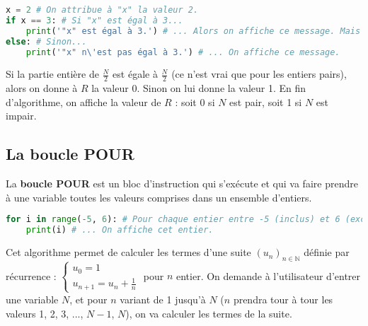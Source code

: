 	\begin{formula}[En python]
		\entretitreetliste
\begin{lstlisting}[language=python]
x = 2 # On attribue à "x" la valeur 2.
if x == 3: # Si "x" est égal à 3...
	print('"x" est égal à 3.') # ... Alors on affiche ce message. Mais ici, "x" vaut 2 donc ce message ne sera jamais affiché.
else: # Sinon...
	print('"x" n\'est pas égal à 3.') # ... On affiche ce message.
\end{lstlisting}
	\end{formula}

	\begin{tip}
		Si la partie entière de $\frac{N}{2}$ est égale à $\frac{N}{2}$ (ce n'est vrai que pour les entiers pairs), alors on donne à $R$ la valeur 0. Sinon on lui donne la valeur 1.
		\newline
		En fin d'algorithme, on affiche la valeur de $R$ : soit 0 si $N$ est pair, soit 1 si $N$ est impair.
	\end{tip}

	\subsection{La boucle POUR}

	La \textbf{boucle POUR} est un bloc d'instruction qui s'exécute et qui va faire prendre à une variable toutes les valeurs comprises dans un ensemble d'entiers.

	\begin{formula}[En python]
		\entretitreetliste
\begin{lstlisting}[language=python]
for i in range(-5, 6): # Pour chaque entier entre -5 (inclus) et 6 (exclu)...
	print(i) # ... On affiche cet entier.
\end{lstlisting}
	\end{formula}

	\begin{tip}
		Cet algorithme permet de calculer les termes d'une suite $(u_n)_{n \in \mathbb{N}}$ définie par récurrence :
		\newpar
		$\begin{cases} u_0 = 1\\ u_{n+1} = u_n + \frac{1}{n}\end{cases}$ pour $n$ entier.
		\newpar
		On demande à l'utilisateur d'entrer une variable $N$, et pour $n$ variant de 1 jusqu'à $N$ ($n$ prendra tour à tour les valeurs 1, 2, 3, ..., $N-1$, $N$), on va calculer les termes de la suite.
	\end{tip}

